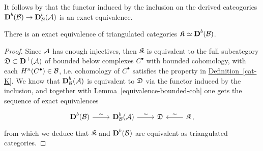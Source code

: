 It follows by \parencite[Proposition~III.2.10]{GM} 
that the functor induced
by the inclusion on the derived cateogories ${\normalfont\textbf{D}}^{b}(\mathcal{B}) \to {\normalfont\textbf{D}}^{b}_{\mathcal{B}}(\mathcal{A})$
is an exact equivalence.

\begin{thm}
	There is an exact equivalence of triangulated categories $\mathfrak{K} \simeq {\normalfont\textbf{D}}^{b}(\mathcal{B})$.
	\begin{proof}
		Since $\mathcal{A}$ has enough injectives, 
		then $\mathfrak{K}$ is equivalent to the full subcategory $\mathfrak{D} \subset {\normalfont\textbf{D}}^{+}(\mathcal{A})$
		of bounded below complexes $C^{\bullet}$ with bounded cohomology, 
		with each $H^{n}(C^{\bullet}) \in \mathcal{B}$, i.e. cohomology of $C^{\bullet}$
		satisfies the property in \hyperref[cat-K]{Definition~\ref{cat-K}}.
		We know that ${\normalfont\textbf{D}}^{b}_{\mathcal{B}}(\mathcal{A})$ is equivalent to $\mathfrak{D}$
		via the functor induced by the inclusion, and together with
		\hyperref[equivalence-bounded-coh]{Lemma~\ref{equivalence-bounded-coh}}
		one gets the sequence of exact equivalences
		\begin{equation*}
			\begin{tikzcd}
				\cat{D}^{b}(\Bb) \ar[r, "\sim"]
				& \cat{D}^{b}_{\Bb}(\Aa) \ar[r, "\sim"]
				& \xD
				& \xK \ar[l, "\sim"']\,,
			\end{tikzcd}
		\end{equation*}
		from which we deduce that $\mathfrak{K}$ and ${\normalfont\textbf{D}}^{b}(\mathcal{B})$
		are equivalent as triangulated categories.
	\end{proof}
\end{thm}















